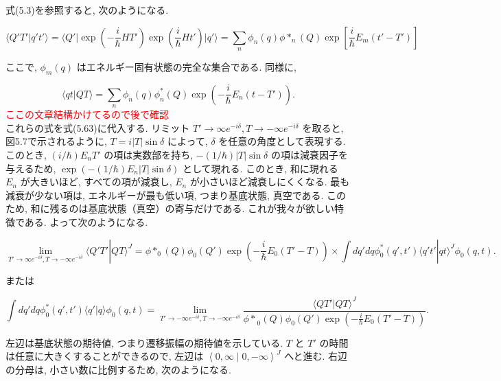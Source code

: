 \documentclass[a4paper,12pt]{article}
\newcommand{\braket}[2]{\left\langle #1\middle|#2\right\rangle}
\begin{document}
式(5.3)を参照すると, 次のようになる.

\begin{equation*}
\langle Q'T' | q't' \rangle = \langle Q' | \exp \left( -\frac{i}{\hbar} H T' \right) \exp \left( \frac{i}{\hbar} H t' \right) | q' \rangle = \sum_{n} \phi_n (q) \phi*_n (Q) \exp\left[ \frac{i}{\hbar}E_m (t' - T') \right] \tag{5.64}
\end{equation*}

ここで, \( \phi_m(q) \) はエネルギー固有状態の完全な集合である. 同様に,

\begin{equation*}
\langle qt | QT \rangle = \sum_n \phi_n(q)\phi_n^*(Q) \exp \left( -\frac{i}{\hbar} E_n(t-T') \right). \tag{5.65}
\end{equation*}
\textcolor{red}{ここの文章結構かけてるので後で確認\\}
これらの式を式(5.63)に代入する. リミット \( T' \to \infty e^{-i\delta}, T \to -\infty e^{-i\delta} \) を取ると, 図5.7で示されるように, \( T = i|T|\sin\delta \) によって, \( \delta \) を任意の角度として表現する. このとき, \( (i/\hbar) E_n T' \) の項は実数部を持ち, \( - (1/\hbar)|T|\sin\delta \) の項は減衰因子を与えるため, \( \exp(-(1/\hbar) E_n |T|\sin\delta) \) として現れる. このとき, 和に現れる \( E_n \) が大きいほど, すべての項が減衰し, \( E_n \) が小さいほど減衰しにくくなる. 最も減衰が少ない項は, エネルギーが最も低い項, つまり基底状態, 真空である. このため, 和に残るのは基底状態（真空）の寄与だけである. これが我々が欲しい特徴である. よって次のようになる.

\begin{equation*}
\lim_{T' \to \infty e^{-i\delta}, T \to -\infty e^{-i\delta}} \langle Q'T' | QT \rangle^J = \phi*_0(Q)\phi_0(Q') \exp \left( -\frac{i}{\hbar} E_0(T'-T) \right)\times \int dq' dq \phi_0^*(q', t') \langle q't' | qt \rangle^J \phi_0(q, t).
\end{equation*}

または

\begin{equation*}
\int dq' dq \phi_0^*(q', t') \langle q' | q \rangle \phi_0(q, t) = \lim_{T' \to -\infty e^{-i\delta}, T \to -\infty e^{-i\delta}} \frac{ \langle QT' | QT \rangle^J}{{\phi*}_{0}(Q)\phi_0(Q')\exp \left( -\frac{i}{\hbar} E_0(T'-T) \right)} . \tag{5.66}
\end{equation*}

左辺は基底状態の期待値, つまり遷移振幅の期待値を示している. \( T \) と \( T' \) の時間は任意に大きくすることができるので, 左辺は $\braket{0, \infty}{0, -\infty}^J$ へと進む. 右辺の分母は, 小さい数に比例するため, 次のようになる.
\end{document}
